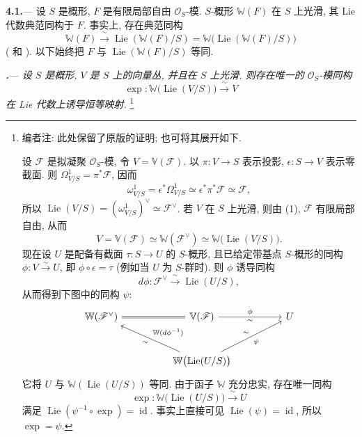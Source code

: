\par\medskip\noindent
\textbf{4.1.}---
设 \(S\) 是概形, \(F\) 是有限局部自由 \(\mathcal O_S\)-模. \(S\)-概形 \(\mathbb W(F)\) 在 \(S\) 上光滑, 其 Lie 代数典范同构于 \(F\). 事实上, 存在典范同构
\[
  \mathbb W(F)
  \xrightarrow{\ \sim\ }
  \operatorname{Lie}(\mathbb W(F)/S)
  =
  \mathbb W\bigl(\operatorname{Lie}(\mathbb W(F)/S)\bigr)
\]
\textup{( 和 )}. 以下始终把 \(F\) 与 \(\operatorname{Lie}(\mathbb W(F)/S)\) 等同.

\par\medskip\noindent
\textbf{\textit{.}}---
\textit{设 \(S\) 是概形, \(V\) 是 \(S\) 上的向量丛, 并且在 \(S\) 上光滑. 则存在唯一的 \(\mathcal O_S\)-模同构}
\[
  \exp\colon
  \mathbb W\bigl(\operatorname{Lie}(V/S)\bigr)
  \xrightarrow{\ \sim\ } V
\]
\textit{在 Lie 代数上诱导恒等映射.}
\footnote{编者注: 此处保留了原版的证明; 也可将其展开如下.

设 \(\mathscr F\) 是拟凝聚 \(\mathcal O_S\)-模, 令 \(V=\mathbb V(\mathscr F)\). 以 \(\pi\colon V\to S\) 表示投影, \(\epsilon\colon S\to V\) 表示零截面. 则 \(\Omega^1_{V/S}=\pi^*\mathscr F\), 因而
\[
  \tag{1}\label{sga3:xix:paragraph:4-1:equation:1}
  \omega^1_{V/S}
  =
  \epsilon^*\Omega^1_{V/S}
  \simeq
  \epsilon^*\pi^*\mathscr F
  \simeq
  \mathscr F,
\]
所以 \(\operatorname{Lie}(V/S)=(\omega^1_{V/S})^\vee\simeq\mathscr F^\vee\). 若 \(V\) 在 \(S\) 上光滑, 则由 \textup{(1)}, \(\mathscr F\) 有限局部自由, 从而
\[
  \tag{2}\label{sga3:xix:paragraph:4-1:equation:2}
  V=\mathbb V(\mathscr F)
  \simeq
  \mathbb W(\mathscr F^\vee)
  \simeq
  \mathbb W\bigl(\operatorname{Lie}(V/S)\bigr).
\]
现在设 \(U\) 是配备有截面 \(\tau\colon S\to U\) 的 \(S\)-概形, 且已给定带基点 \(S\)-概形的同构 \(\phi\colon V\xrightarrow{\sim}U\), 即 \(\phi\circ\epsilon=\tau\) \textup{(例如当 \(U\) 为 \(S\)-群时)}. 则 \(\phi\) 诱导同构
\[
  d\phi\colon
  \mathscr F^\vee
  \xrightarrow{\ \sim\ }
  \operatorname{Lie}(U/S),
\]
从而得到下图中的同构 \(\psi\):
\[
\begin{tikzcd}[
  ampersand replacement=\&,
  column sep=huge,
  row sep=large
]
  \mathbb W(\mathscr F^\vee)
    \arrow[r,equal]
  \&
  \mathbb V(\mathscr F)
    \arrow[r,"\phi","\sim"']
  \&
  U
  \\
  \&
  \mathbb W\bigl(\operatorname{Lie}(U/S)\bigr)
    \arrow[ul,"\sim","\mathbb W(d\phi^{-1})"']
    \arrow[ur,"\sim","\psi"']
  \&
\end{tikzcd}
\]
它将 \(U\) 与 \(\mathbb W(\operatorname{Lie}(U/S))\) 等同. 由于函子 \(\mathbb W\) 充分忠实, 存在唯一同构
\[
  \exp\colon
  \mathbb W\bigl(\operatorname{Lie}(U/S)\bigr)
  \xrightarrow{\ \sim\ }U
\]
满足 \(\operatorname{Lie}(\psi^{-1}\circ\exp)=\operatorname{id}\). 事实上直接可见 \(\operatorname{Lie}(\psi)=\operatorname{id}\), 所以 \(\exp=\psi\).}


